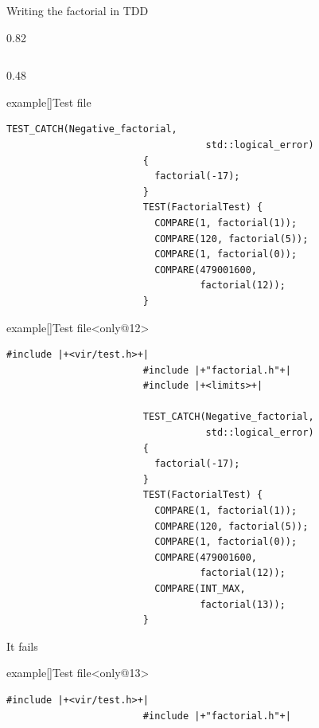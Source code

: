 \begin{frame}[fragile]{Writing the factorial in TDD}
\begin{overlayarea}{\textwidth}{0.82\textheight}
\begin{columns}[T]
\begin{column}{0.48\textwidth}
\begin{varblock}{example}[\textwidth]{Test file}
\begin{lstlisting}[style=MyCpp, belowskip=-10mm]
                        TEST_CATCH(Negative_factorial,
                                   std::logical_error)
                        {
                          factorial(-17);
                        }
                        TEST(FactorialTest) {
                          COMPARE(1, factorial(1));
                          COMPARE(120, factorial(5));
                          COMPARE(1, factorial(0));
                          COMPARE(479001600,
                                  factorial(12));
                        }
                    \end{lstlisting}
                    {\scriptsize{}}
                \end{varblock}
                \begin{varblock}{example}[\textwidth]{Test file}<only@12>
                    \begin{lstlisting}[style=MyCpp, belowskip=-10mm]
                        #include |+<vir/test.h>+|
                        #include |+"factorial.h"+|
                        #include |+<limits>+|

                        TEST_CATCH(Negative_factorial,
                                   std::logical_error)
                        {
                          factorial(-17);
                        }
                        TEST(FactorialTest) {
                          COMPARE(1, factorial(1));
                          COMPARE(120, factorial(5));
                          COMPARE(1, factorial(0));
                          COMPARE(479001600,
                                  factorial(12));
                          COMPARE(INT_MAX,
                                  factorial(13));
                        }
                    \end{lstlisting}
                    {\scriptsize\alert{It fails}}
                \end{varblock}
                \begin{varblock}{example}[\textwidth]{Test file}<only@13>
                    \begin{lstlisting}[style=MyCpp, belowskip=-10mm]
                        #include |+<vir/test.h>+|
                        #include |+"factorial.h"+|


\end{lstlisting}
\end{varblock}
\end{column}
\end{columns}
\end{overlayarea}
\end{frame}
